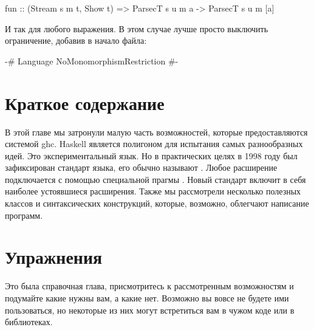 \begin{code}
fun :: (Stream s m t, Show t) => ParsecT s u m a -> ParsecT s u m [a]
\end{code}

И так для любого выражения. В этом случае лучше просто выключить
ограничение, добавив в начало файла:

\begin{code}
{-# Language NoMonomorphismRestriction #-}
\end{code}

\section{Краткое содержание}

В этой главе мы затронули малую часть возможностей,
которые предоставляются системой ghc. Haskell является
полигоном для испытания самых разнообразных идей. 
Это экспериментальный язык. Но в практических целях в 1998
году был зафиксирован стандарт языка, его обычно называют
. Любое расширение
подключается с помощью специальной прагмы .
Новый стандарт  включит в себя наиболее
устоявшиеся расширения. Также мы рассмотрели несколько полезных классов
и синтаксических конструкций, которые, возможно, облегчают написание
программ.

\section{Упражнения}

Это была справочная глава, присмотритесь к рассмотренным возможностям
и подумайте какие нужны вам, а какие нет. Возможно вы вовсе не будете
ими пользоваться, но некоторые из них могут встретиться вам в 
чужом коде или в библиотеках. 


